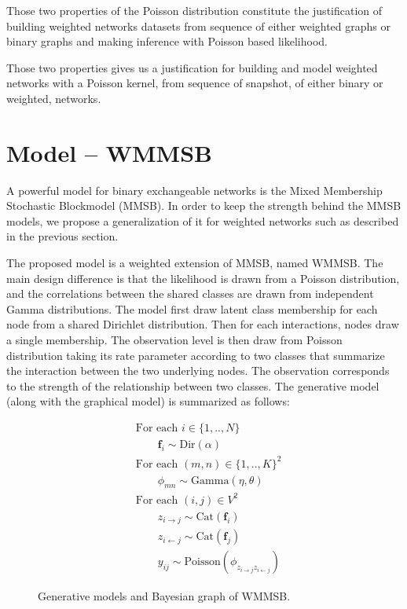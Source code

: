 Those two properties of the Poisson distribution constitute the justification of building weighted networks datasets from sequence of either weighted graphs or binary graphs and making inference with Poisson based likelihood.

Those two properties gives us a justification for building and model weighted networks with a Poisson kernel, from sequence of snapshot, of either binary or weighted, networks. 

\section{Model -- WMMSB}
A powerful model for binary exchangeable networks is the Mixed Membership Stochastic Blockmodel (MMSB). In order to keep the strength behind the MMSB models, we propose a generalization of it for weighted networks such as described in the previous section.

The proposed model is a weighted extension of MMSB, named WMMSB. The main design difference is that the likelihood is drawn from a Poisson distribution, and the correlations between the shared classes are drawn from independent Gamma distributions. The model first draw latent class membership for each node from a shared Dirichlet distribution. Then for each interactions,  nodes draw a single membership. The observation level is then draw from Poisson distribution taking its rate parameter according to two classes that summarize the interaction between the two underlying nodes. The observation corresponds to the strength of the relationship between two classes. The generative model (along  with the graphical model) is summarized as follows:

\begin{figure}[h]
    \hspace*{-3.7em}
\begin{minipage}[h]{0.3\linewidth}
\begin{align*}
	&\textrm{For each } i \in \{1, .., N\}  \\
	&\qquad\bm{f}_i \sim \textrm{Dir}(\alpha)\\
	&\textrm{For each }  (m,n) \in \{1,..,K\}^2 \\
	&\qquad\phi_{mn} \sim \mathrm{Gamma}(\eta,\theta)\\
	&\textrm{For each } (i,j) \in V^2 \\
	&\qquad z_{i \rightarrow j} \sim \mbox{Cat}(\bm{f}_i)\\
	&\qquad z_{i \leftarrow j} \sim \mbox{Cat}(\bm{f}_j)\\
    &\qquad y_{ij} \sim \mathrm{Poisson}(\phi_{z_{i \rightarrow j}z_{i \leftarrow j}})
\end{align*}
\end{minipage}
\begin{minipage}[h]{0.3\linewidth}
	\scalebox{0.88}{}
\end{minipage}
    \caption{Generative models and Bayesian graph of WMMSB.}
\end{figure}


